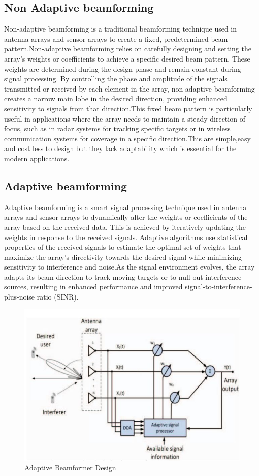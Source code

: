 \subsection{Non Adaptive beamforming}
   Non-adaptive beamforming is a traditional beamforming technique used in antenna arrays and sensor arrays to create a fixed, predetermined beam pattern.Non-adaptive beamforming relies on carefully designing and setting the array's weights or coefficients to achieve a specific desired beam pattern. These weights are determined during the design phase and remain constant during signal processing. By controlling the phase and amplitude of the signals transmitted or received by each element in the array, non-adaptive beamforming creates a narrow main lobe in the desired direction, providing enhanced sensitivity to signals from that direction.This fixed beam pattern is particularly useful in applications where the array needs to maintain a steady direction of focus, such as in radar systems for tracking specific targets or in wireless communication systems for coverage in a specific direction.This are simple,easy and cost less to design but they lack adaptability which is essential for the modern applications.
\subsection{Adaptive beamforming}   
   Adaptive beamforming is a smart signal processing technique used in antenna arrays and sensor arrays to dynamically alter the weights or coefficients of the array based on the received data. 
This is achieved by iteratively updating the weights in response to the received signals. Adaptive algorithms use statistical properties of the received signals to estimate the optimal set of weights that maximize the array's directivity towards the desired signal while minimizing sensitivity to interference and noise.As the signal environment evolves, the array adapts its beam direction to track moving targets or to null out interference sources, resulting in enhanced performance and improved signal-to-interference-plus-noise ratio (SINR).
\begin{figure}[h]
\centering
\includegraphics[scale=0.75]{Chapter2/Figures/1}		
\caption{ \label{fig:1}Adaptive Beamformer Design}
\end{figure} 

